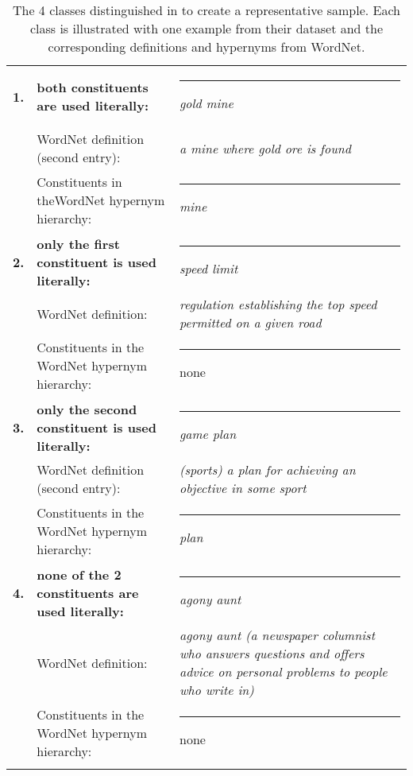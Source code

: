 \begin{table}[p]
  \begin{tabularx}{\textwidth}{lQQ}\lsptoprule
  \textbf{1.}&\textbf{both constituents are used literally:}&{\rule{18pt}{0pt}}\newline \emph{gold mine}\\\tablevspace%
&WordNet definition (second entry):& \emph{a mine where gold ore is found}\\\tablevspace%
&Constituents in the\newline WordNet hypernym hierarchy:&{\rule{18pt}{0pt}}\newline  \emph{mine}\\\tablevspace %
\textbf{2.}&\textbf{only the first constituent is used literally:}&{\rule{18pt}{0pt}}\newline  \emph{speed limit}\\\tablevspace%
& WordNet definition:& \emph{regulation establishing the top speed permitted on
   a given road}\\\tablevspace%
&Constituents in the WordNet hypernym hierarchy:&{\rule{18pt}{0pt}}\newline  none\\\tablevspace
\textbf{3.}&\textbf{only the second constituent is used literally:}&{\rule{18pt}{0pt}}\newline  \emph{game plan}\\\tablevspace%
&WordNet definition (second entry):& \emph{(sports) a plan for achieving an objective in some sport}\\\tablevspace%
&Constituents in the WordNet hypernym hierarchy:&{\rule{18pt}{0pt}}\newline  \emph{plan}\\ \tablevspace
\textbf{4.}& \textbf{none of the 2 constituents are used literally:}&{\rule{18pt}{0pt}}\newline  \emph{agony aunt}\\\tablevspace %
&WordNet definition:& \emph{agony aunt (a newspaper
  columnist who answers questions and offers advice on personal problems to
  people who write in)}\\\tablevspace%
&Constituents in the WordNet hypernym hierarchy:&{\rule{18pt}{0pt}}\newline  none\\\lspbottomrule 
\end{tabularx}
  \caption{The 4 classes distinguished in \citet{Reddyetal:2011} to create a representative sample. Each class is illustrated with one example from their dataset and the corresponding definitions and hypernyms from WordNet.}
  \label{tab:reddy4classes}
\end{table}
